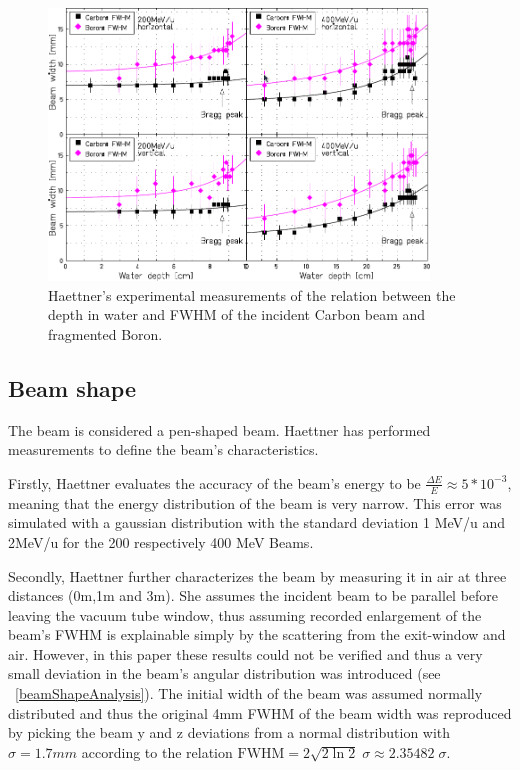 \begin{figure}[h] 
\begin{center}
\includegraphics[width=0.9\textwidth]{images/haettner48.png}  
\caption{\label{fig:haettner48} Haettner's experimental measurements of the relation between the depth in water and FWHM of the incident Carbon beam and fragmented Boron.}
 \end{center}
 \end{figure}

\subsection{Beam shape}


The beam is considered a pen-shaped beam. Haettner has performed measurements to define the beam's characteristics.

Firstly, Haettner evaluates the accuracy of the beam's energy to be $\frac{\Delta E}{E}\approx5*10^{-3}$, meaning that the energy distribution of the beam is very narrow. This error was simulated with a gaussian distribution with the standard deviation 1 MeV/u and 2MeV/u for the 200 respectively 400 MeV Beams.

Secondly, Haettner further characterizes the beam by measuring it in air at three distances (0m,1m and 3m). She assumes the incident beam to be parallel before leaving the vacuum tube window, thus assuming recorded enlargement of the beam's FWHM is explainable simply by the scattering from the exit-window and air. However, in this paper these results could not be verified and thus a very small deviation in the beam's angular distribution was introduced (see ~\ref{beamShapeAnalysis}). The initial width of the beam was assumed normally distributed and thus the original 4mm FWHM of the beam width was reproduced by picking the beam y and z deviations from a normal distribution with $\sigma = 1.7mm$ according to the relation $\mathrm{FWHM} =   2 \sqrt{2 \ln 2 } \; \sigma \approx 2.35482 \; \sigma$.

